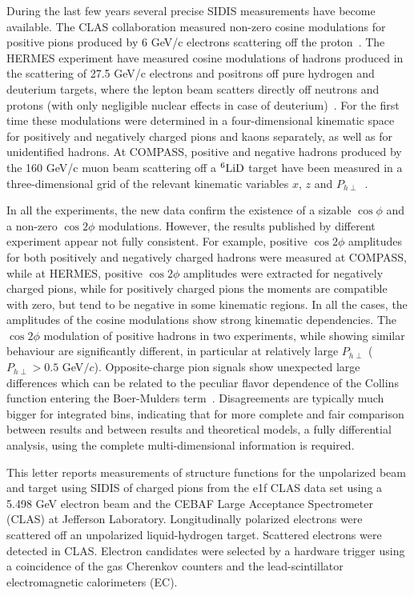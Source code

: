 \documentclass[aps,prl,twocolumn,showpacs,superscriptaddress,groupedaddress]{revtex4}  %
\newcommand{\Phperp}{P_{h\perp}}
\begin{document}
During the last few years several precise SIDIS measurements have become available. The CLAS
collaboration measured non-zero cosine modulations for positive pions produced
by 6 GeV/c electrons scattering off the proton~\cite{Osipenko:2008rv}.  The
HERMES experiment have measured cosine modulations of hadrons produced in the
scattering of 27.5 GeV/c electrons and positrons off pure hydrogen and deuterium
targets, where the lepton beam scatters directly off neutrons and protons (with
only negligible nuclear effects in case of
deuterium)~\cite{Airapetian:2012yg}. For the first time these modulations were
determined in a four-dimensional kinematic space for positively and negatively
charged pions and kaons separately, as well as for unidentified hadrons. At
COMPASS, positive and negative hadrons produced by the 160 GeV/c muon beam
scattering off a $\rm ^6LiD$ target have been measured in a three-dimensional
grid of the relevant kinematic variables $x$, $z$ and
$\Phperp$~\cite{Adolph:2014pwc}.

In all the experiments, the new data confirm the existence of a sizable
$\cos\phi$ and a non-zero $\cos2\phi$ modulations.  However, the results
published by different experiment appear not fully consistent. For example,
positive $\cos2\phi$ amplitudes for both positively and negatively charged
hadrons were measured at COMPASS, while at HERMES, positive $\cos 2\phi$ amplitudes
were extracted for negatively charged pions, while for positively charged pions
the moments are compatible with zero, but tend to be negative in some kinematic
regions. In all the cases, the amplitudes of the cosine modulations show strong
kinematic dependencies. 
The $\cos2\phi$ modulation of positive hadrons in two experiments, while showing similar behaviour are significantly different, in particular at relatively large $\Phperp$  ($\Phperp>0.5$ GeV$/c$).
Opposite-charge pion signals show unexpected large differences which can be related to the peculiar flavor dependence of the Collins function entering the Boer-Mulders term~\cite{Airapetian:2012yg}. Disagreements are typically much bigger for integrated bins, indicating that for 
more complete and fair comparison between results and between results
and theoretical models, a fully differential analysis, using the complete
multi-dimensional information is required.


This letter reports measurements of structure functions for the unpolarized beam and target using SIDIS of charged pions from the e1f CLAS data set 
using a 5.498 GeV electron beam and the CEBAF Large Acceptance 
Spectro\-meter (CLAS) \cite{Mecking:2003zu} at Jefferson Laboratory.
Longitudinally polarized electrons were scattered off
an unpolarized liquid-hydrogen target. 
Scattered electrons were detected in CLAS.
Electron candidates were selected by a hardware trigger using a 
coincidence of the gas Cherenkov counters and the lead-scintillator electromagnetic calorimeters (EC). 
\end{document}
